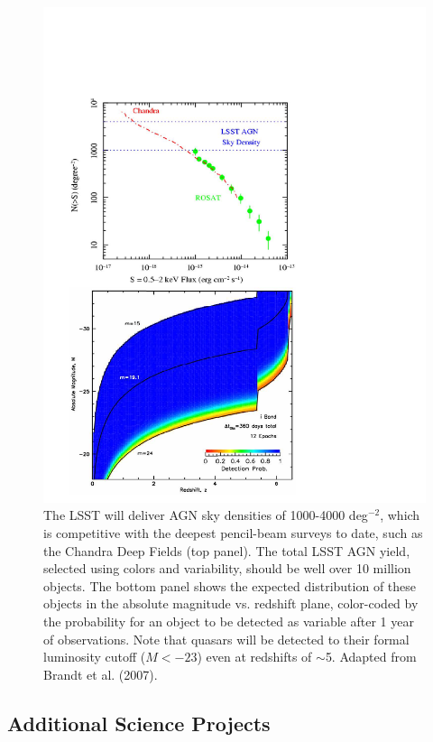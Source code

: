 \documentclass{emulateapj}
\begin{document}
\begin{figure}
\includegraphics[width=1.0\hsize,clip]{panels3.pdf}
\caption{The LSST will deliver AGN sky densities of 1000-4000 deg$^{-2}$, which is 
competitive with the deepest pencil-beam surveys to date, such as the Chandra
Deep Fields (top panel). The total LSST AGN yield, selected using colors and
variability, should be well over 10 million objects. 
The bottom panel shows the expected distribution of these objects in the 
absolute magnitude vs. redshift plane, color-coded by the probability for
an object to be
detected as variable after 1 year of observations. Note that quasars will
be detected to their formal luminosity cutoff ($M< -23$) even at redshifts
of $\sim$5. Adapted from Brandt et al. (2007).} 
\label{Fig:panels3}
\end{figure}


\subsection{  Additional Science Projects}
\end{document}
